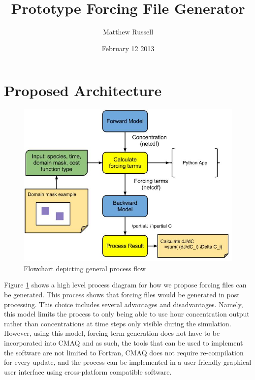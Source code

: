 \documentclass{article}
\title{Prototype Forcing File Generator}
\author{Matthew Russell}
\date{February 12 2013}
\begin{document}
\maketitle

\section{Proposed Architecture}

\begin{figure}
	\centering
	\includegraphics[width=\linewidth]{CMAQ-Adjoint-Process.jpg}
	\caption{Flowchart depicting general process flow}
	\label{process}
\end{figure}

Figure \ref{process} shows a high level process diagram for how we propose
forcing files can be generated.  This process shows that forcing files would be
generated in post processing.  This choice includes several advantages and
disadvantages.  Namely, this model limits the process to only being able to use
hour concentration output rather than concentrations at time steps only visible
during the simulation.  However, using this model, forcing term generation does
not have to be incorporated into CMAQ and as such, the tools that can be used
to implement the software are not limited to Fortran, CMAQ does not require
re-compilation for every update, and the process can be implemented in a
user-friendly graphical user interface using cross-platform compatible
software.
\end{document}
